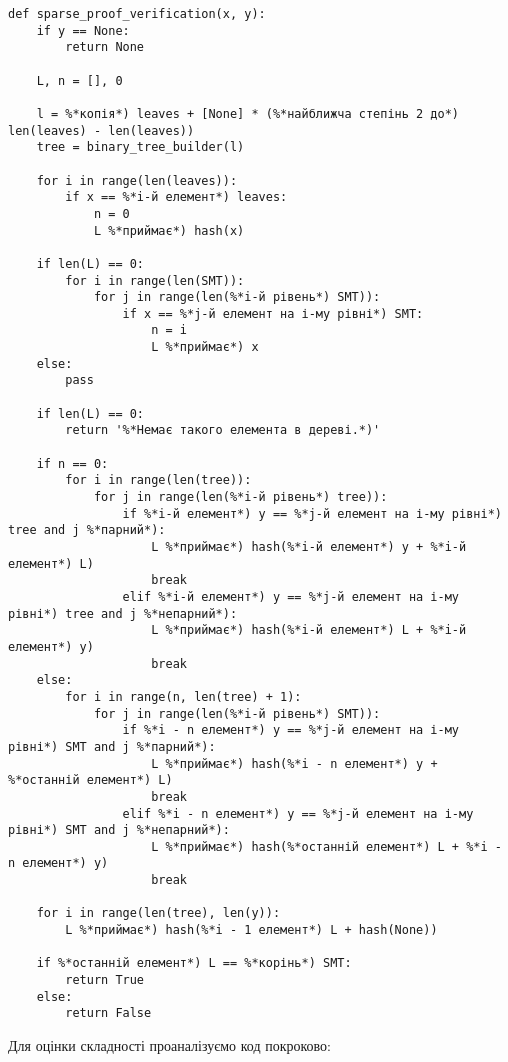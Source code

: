 \documentclass[a4paper, 12pt]{article}
\begin{document}
\begin{lstlisting}
def sparse_proof_verification(x, y):
    if y == None:
        return None
    
    L, n = [], 0
    
    l = %*копія*) leaves + [None] * (%*найближча степінь 2 до*) len(leaves) - len(leaves))
    tree = binary_tree_builder(l)
    
    for i in range(len(leaves)):
        if x == %*i-й елемент*) leaves:
            n = 0
            L %*приймає*) hash(x)
    
    if len(L) == 0:
        for i in range(len(SMT)):
            for j in range(len(%*i-й рівень*) SMT)):
                if x == %*j-й елемент на і-му рівні*) SMT:
                    n = i
                    L %*приймає*) x
    else:
        pass
    
    if len(L) == 0:
        return '%*Немає такого елемента в дереві.*)'
    
    if n == 0:
        for i in range(len(tree)):
            for j in range(len(%*i-й рівень*) tree)):
                if %*i-й елемент*) y == %*j-й елемент на і-му рівні*) tree and j %*парний*):
                    L %*приймає*) hash(%*i-й елемент*) y + %*i-й елемент*) L)
                    break
                elif %*i-й елемент*) y == %*j-й елемент на і-му рівні*) tree and j %*непарний*):
                    L %*приймає*) hash(%*i-й елемент*) L + %*i-й елемент*) y)
                    break
    else:
        for i in range(n, len(tree) + 1):
            for j in range(len(%*i-й рівень*) SMT)):
                if %*i - n елемент*) y == %*j-й елемент на і-му рівні*) SMT and j %*парний*):
                    L %*приймає*) hash(%*i - n елемент*) y + %*останній елемент*) L)
                    break
                elif %*i - n елемент*) y == %*j-й елемент на і-му рівні*) SMT and j %*непарний*):
                    L %*приймає*) hash(%*останній елемент*) L + %*i - n елемент*) y)
                    break
    
    for i in range(len(tree), len(y)):
        L %*приймає*) hash(%*i - 1 елемент*) L + hash(None))
        
    if %*останній елемент*) L == %*корінь*) SMT:
        return True
    else:
        return False
\end{lstlisting}

\par Для оцінки складності проаналізуємо код покроково:
\end{document}

